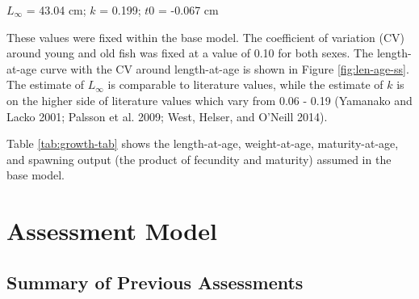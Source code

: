 \documentclass[11pt,
  english,
  a4paper,
]{article}
\begin{document}
\leavevmode\tagmcend\tagstructend\par

\begin{centering}

$L_{\infty}$ = 43.04 cm; $k$ = 0.199; $t0$ = -0.067 cm  

\end{centering}


These values were fixed within the base model. The coefficient of variation (CV) around young and old fish was fixed at a value of 0.10 for both sexes. The length-at-age curve with the CV around length-at-age is shown in Figure \ref{fig:len-age-ss}. The estimate of {\(L_{\infty}\)\leavevmode\tagmcend\tagstructend} is comparable to literature values, while the estimate of {\(k\)\leavevmode\tagmcend\tagstructend} is on the higher side of literature values which vary from 0.06 - 0.19 {(Yamanako and Lacko 2001; Palsson et al. 2009; West, Helser, and O'Neill 2014)\leavevmode\tagmcend\tagstructend}.

\leavevmode\tagmcend\tagstructend\par


Table \ref{tab:growth-tab} shows the length-at-age, weight-at-age, maturity-at-age, and spawning output (the product of fecundity and maturity) assumed in the base model.

\leavevmode\tagmcend\tagstructend\par


\hypertarget{assessment-model}{%
\section{Assessment Model}\label{assessment-model}}

\leavevmode\tagmcend\tagstructend


\hypertarget{summary-of-previous-assessments}{%
\subsection{Summary of Previous Assessments}\label{summary-of-previous-assessments}}
\end{document}

